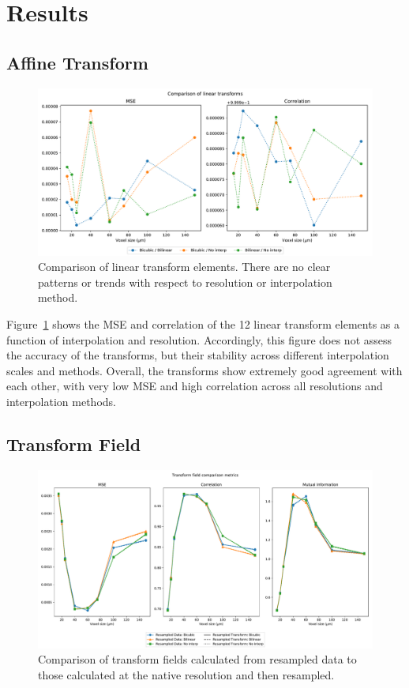 \documentclass[11pt]{article}
\begin{document}
\section{Results}
\subsection{Affine Transform}

\begin{figure}[h]
  \centering
  \includegraphics[width=\linewidth]{../results/plots/affine}
  \captionsetup{width=0.95\linewidth}
  \caption{Comparison of linear transform elements. There are no clear patterns
    or trends with respect to resolution or interpolation method.}
  \label{fig:affine}
\end{figure}

Figure~\ref{fig:affine} shows the MSE and correlation of the 12 linear transform
elements as a function of interpolation and resolution. Accordingly, this figure
does not assess the accuracy of the transforms, but their stability across
different interpolation scales and methods.  Overall, the transforms show
extremely good agreement with each other, with very low MSE and high
correlation across all resolutions and interpolation methods. 


\subsection{Transform Field}

\begin{figure}[h]
  \centering
  \includegraphics[width=\linewidth]{../results/plots/warp_field}
  \captionsetup{width=0.95\linewidth}
  \caption{Comparison of transform fields calculated from resampled data to
    those calculated at the native resolution and then resampled.}
      \label{fig:warp}
\end{figure}
\end{document}
